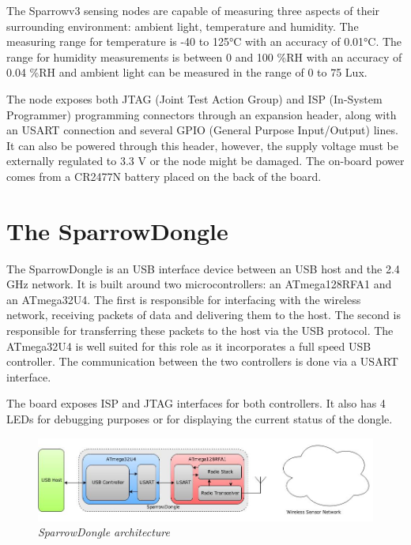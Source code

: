 The Sparrowv3 sensing nodes are capable of measuring three aspects of their
surrounding environment: ambient light, temperature and humidity. The measuring
range for temperature is -40 to 125°C with an accuracy of 0.01°C. The range
for humidity measurements is between 0 and 100 \%RH with an accuracy of 0.04 \%RH and ambient light can be
measured in the range of 0 to 75 Lux.

The node exposes both JTAG (Joint Test Action Group) and ISP (In-System
Programmer) programming connectors through an expansion header, along with an
USART connection and several GPIO (General Purpose Input/Output) lines. It can
also be powered through this header, however, the supply voltage must be externally
regulated to 3.3 V or the node might be damaged.  The on-board power comes
from a CR2477N battery placed on the back of the board.

\section{The SparrowDongle}

The SparrowDongle is an USB interface device between an USB host and the 2.4 GHz
network. It is built around two microcontrollers: an ATmega128RFA1 and an
ATmega32U4. The first is responsible for interfacing with the wireless network,
receiving packets of data and delivering them to the host. The
second is responsible for transferring these packets to the host via the USB
protocol. The ATmega32U4 is well suited for this role as it incorporates a full
speed USB controller. The communication between the two controllers is done via
a USART interface.

The board exposes ISP and JTAG interfaces for both controllers. It also has 4
LEDs for debugging purposes or for displaying the current status of the dongle.

\begin{figure}[ht]
	\begin{center}
		\includegraphics[width=\textwidth]{img/sparrowdongle.jpg}
	\end{center}
	\caption{\small \itshape{SparrowDongle architecture}}
\end{figure}

